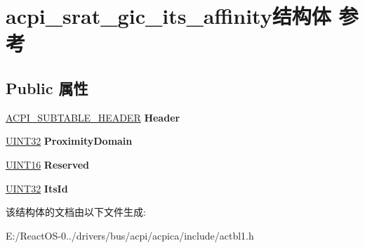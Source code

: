 \hypertarget{structacpi__srat__gic__its__affinity}{}\section{acpi\+\_\+srat\+\_\+gic\+\_\+its\+\_\+affinity结构体 参考}
\label{structacpi__srat__gic__its__affinity}
\subsection*{Public 属性}
\begin{DoxyCompactItemize}
\item 
\mbox{\label{structacpi__srat__gic__its__affinity_a0a41aef0407a86e15321588f6b69d116}} 
\hyperlink{structacpi__subtable__header}{A\+C\+P\+I\+\_\+\+S\+U\+B\+T\+A\+B\+L\+E\+\_\+\+H\+E\+A\+D\+ER} {\bfseries Header}
\item 
\mbox{\label{structacpi__srat__gic__its__affinity_a0bf7429ea958f8e1c3265e5f6ce1ef51}} 
\hyperlink{_processor_bind_8h_ae1e6edbbc26d6fbc71a90190d0266018}{U\+I\+N\+T32} {\bfseries Proximity\+Domain}
\item 
\mbox{\label{structacpi__srat__gic__its__affinity_abbe3925b24385ab0508fe6091e3865bc}} 
\hyperlink{_processor_bind_8h_a09f1a1fb2293e33483cc8d44aefb1eb1}{U\+I\+N\+T16} {\bfseries Reserved}
\item 
\mbox{\label{structacpi__srat__gic__its__affinity_a147e091beb6bd90d6020f4db890fe2ee}} 
\hyperlink{_processor_bind_8h_ae1e6edbbc26d6fbc71a90190d0266018}{U\+I\+N\+T32} {\bfseries Its\+Id}
\end{DoxyCompactItemize}


该结构体的文档由以下文件生成\+:\begin{DoxyCompactItemize}
\item 
E\+:/\+React\+O\+S-\/0../drivers/bus/acpi/acpica/include/actbl1.\+h\end{DoxyCompactItemize}
